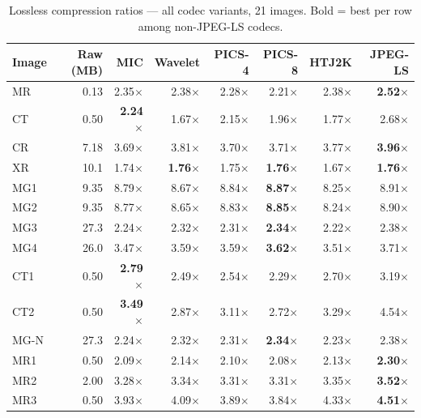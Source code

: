 \documentclass[10pt,twocolumn]{article}
\begin{document}
\begin{table}[t]
\centering
\footnotesize
\setlength{\tabcolsep}{4pt}
\caption{Lossless compression ratios --- all codec variants, 21 images. Bold = best per row among non-JPEG-LS codecs.}
\label{tab:ratios}
\begin{tabular}{lrrrrrrr}
\toprule
Image & Raw (MB) & MIC & Wavelet & PICS-4 & PICS-8 & HTJ2K & JPEG-LS \\
\midrule
MR   & 0.13 & 2.35$\times$ & 2.38$\times$ & 2.28$\times$ & 2.21$\times$ & 2.38$\times$ & \textbf{2.52$\times$} \\
CT   & 0.50 & \textbf{2.24$\times$} & 1.67$\times$ & 2.15$\times$ & 1.96$\times$ & 1.77$\times$ & 2.68$\times$ \\
CR   & 7.18 & 3.69$\times$ & 3.81$\times$ & 3.70$\times$ & 3.71$\times$ & 3.77$\times$ & \textbf{3.96$\times$} \\
XR   & 10.1 & 1.74$\times$ & \textbf{1.76$\times$} & 1.75$\times$ & \textbf{1.76$\times$} & 1.67$\times$ & \textbf{1.76$\times$} \\
MG1  & 9.35 & 8.79$\times$ & 8.67$\times$ & 8.84$\times$ & \textbf{8.87$\times$} & 8.25$\times$ & 8.91$\times$ \\
MG2  & 9.35 & 8.77$\times$ & 8.65$\times$ & 8.83$\times$ & \textbf{8.85$\times$} & 8.24$\times$ & 8.90$\times$ \\
MG3  & 27.3 & 2.24$\times$ & 2.32$\times$ & 2.31$\times$ & \textbf{2.34$\times$} & 2.22$\times$ & 2.38$\times$ \\
MG4  & 26.0 & 3.47$\times$ & 3.59$\times$ & 3.59$\times$ & \textbf{3.62$\times$} & 3.51$\times$ & 3.71$\times$ \\
CT1  & 0.50 & \textbf{2.79$\times$} & 2.49$\times$ & 2.54$\times$ & 2.29$\times$ & 2.70$\times$ & 3.19$\times$ \\
CT2  & 0.50 & \textbf{3.49$\times$} & 2.87$\times$ & 3.11$\times$ & 2.72$\times$ & 3.29$\times$ & 4.54$\times$ \\
MG-N & 27.3 & 2.24$\times$ & 2.32$\times$ & 2.31$\times$ & \textbf{2.34$\times$} & 2.23$\times$ & 2.38$\times$ \\
MR1  & 0.50 & 2.09$\times$ & 2.14$\times$ & 2.10$\times$ & 2.08$\times$ & 2.13$\times$ & \textbf{2.30$\times$} \\
MR2  & 2.00 & 3.28$\times$ & 3.34$\times$ & 3.31$\times$ & 3.31$\times$ & 3.35$\times$ & \textbf{3.52$\times$} \\
MR3  & 0.50 & 3.93$\times$ & 4.09$\times$ & 3.89$\times$ & 3.84$\times$ & 4.33$\times$ & \textbf{4.51$\times$} \\

\end{tabular}
\end{table}
\end{document}
